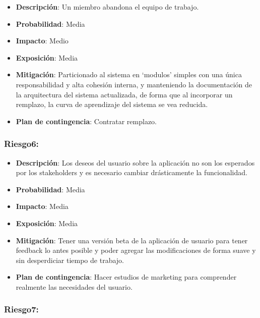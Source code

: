 \begin{itemize}
\itemsep1pt\parskip0pt
\item
  \textbf{Descripción}: Un miembro abandona el equipo de trabajo.
\item
  \textbf{Probabilidad}: Media
\item
  \textbf{Impacto}: Medio
\item
  \textbf{Exposición}: Media
\item
  \textbf{Mitigación}: Particionado al sistema en `modulos' simples con
  una única responsabilidad y alta cohesión interna, y manteniendo la
  documentación de la arquitectura del sistema actualizada, de forma que
  al incorporar un remplazo, la curva de aprendizaje del sistema se vea
  reducida.
\item
  \textbf{Plan de contingencia}: Contratar remplazo.
\end{itemize}

\subsubsection{Riesgo6:}

\begin{itemize}
\itemsep1pt\parskip0pt
\item
  \textbf{Descripción}: Los deseos del usuario sobre la aplicación no
  son los esperados por los stakeholders y es necesario cambiar
  drásticamente la funcionalidad.
\item
  \textbf{Probabilidad}: Media
\item
  \textbf{Impacto}: Media
\item
  \textbf{Exposición}: Media
\item
  \textbf{Mitigación}: Tener una versión beta de la aplicación de
  usuario para tener feedback lo antes posible y poder agregar las
  modificaciones de forma suave y sin desperdiciar tiempo de trabajo.
\item
  \textbf{Plan de contingencia}: Hacer estudios de marketing para
  comprender realmente las necesidades del usuario.
\end{itemize}

\subsubsection{Riesgo7:}

